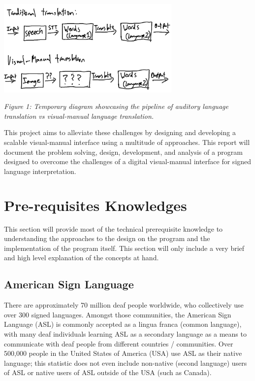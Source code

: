 \documentclass[11pt]{article}
\def\paraskip{\vskip 0.4cm}
\begin{document}
    \begin{center}
        \includegraphics[width=9cm]{audVsVM.png}
        \\
        \raggedright \textit{
        Figure 1: Temporary diagram showcasing the pipeline of auditory language translation vs visual-manual language translation.
        }
    \end{center}

    This project aims to alleviate these challenges by designing and developing a scalable visual-manual interface using a multitude of approaches. This report will document the problem solving, design, development, and analysis of a program designed to overcome the challenges of a digital visual-manual interface for signed language interpretation.


\section{Pre-requisites Knowledges}
    This section will provide most of the technical prerequisite knowledge to understanding the approaches to the design on the program and the implementation of the program itself. This section will only include a very brief and high level explanation of the concepts at hand.

    \subsection{American Sign Language}
        There are approximately 70 million deaf people worldwide, who collectively use over 300 signed languages. Amongst those communities, the American Sign Language (ASL) is commonly accepted as a lingua franca (common language), with many deaf individuals learning ASL as a secondary language as a means to communicate with deaf people from different countries / communities. Over 500,000 people in the United States of America (USA) use ASL as their native language; this statistic does not even include non-native (second language) users of ASL or native users of ASL outside of the USA (such as Canada). 
        \paraskip
\end{document}
